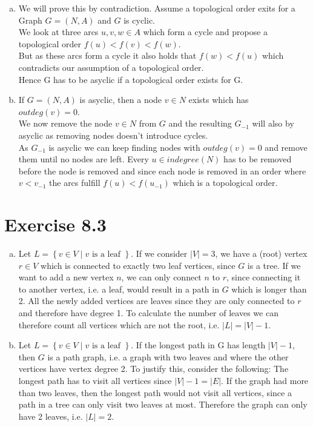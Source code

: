 \documentclass{article} %
\newcommand{\homeworkNumber}{8}
\begin{document}
\begin{enumerate}[(a)]
	\item
	We will prove this by contradiction. Assume a topological order exits for a Graph $G = (N,A)$ and $G$ is cyclic. \\
	We look at three arcs $u,v,w \in A$ which form a cycle and propose a topological order $f(u)<f(v)<f(w)$.\\
	But as these arcs form a cycle it also holds that $f(w) < f(u)$ which contradicts our assumption of a topological order. \\
	Hence G has to be asyclic if a topological order exists for G.
	\item
	If $G = (N,A)$ is asyclic, then a node $v \in N$ exists which has $outdeg(v)=0$. \\
	We now remove the node $v \in N$ from $G$ and the resulting $G_{-1}$ will also by asyclic as removing nodes doesn't introduce cycles. \\
	As $G_{-1}$ is asyclic we can keep finding nodes with $outdeg(v)=0$ and remove them until no nodes are left.
	Every $u \in indegree(N)$ has to be removed before the node is removed and since each node is removed in an order where $v < v_{-1}$ the arcs fulfill $f(u) < f(u_{-1})$ which is a topological order.
\end{enumerate}



\section*{Exercise \homeworkNumber.3}

\begin{enumerate}[(a)]
	\item Let \( L = \left\{ v \in V \mid v\text{ is a leaf } \right\} \). If we consider \( |V| = 3\), we have a (root) vertex \( r \in V \) which is connected to exactly two leaf vertices, since \( G \) is a tree. If we want to add a new vertex \( n \), we can only connect \( n \) to \( r \), since connecting it to another vertex, i.e. a leaf, would result in a path in \( G \) which is longer than 2. All the newly added vertices are leaves since they are only connected to \( r \) and therefore have degree 1. To calculate the number of leaves we can therefore count all vertices which are not the root, i.e. \( |L| = |V| - 1\).
	\item Let \( L = \left\{ v \in V \mid v\text{ is a leaf } \right\} \). If the longest path in G has length \( |V| - 1\), then \( G \) is a path graph, i.e. a graph with two leaves and where the other vertices have vertex degree 2. To justify this, consider the following: The longest path has to visit all vertices since \( |V| - 1 = |E| \). If the graph had more than two leaves, then the longest path would not visit all vertices, since a path in a tree can only visit two leaves at most. Therefore the graph can only have 2 leaves, i.e. \( |L| = 2 \).
\end{enumerate}
\end{document}
